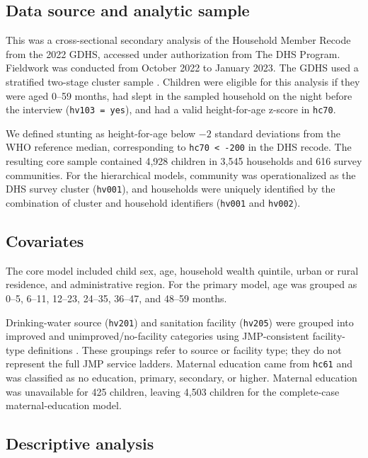 \documentclass[11pt]{article}
\begin{document}
\subsection{Data source and analytic sample}

This was a cross-sectional secondary analysis of the Household Member Recode from the 2022 GDHS, accessed under authorization from The DHS Program. Fieldwork was conducted from October 2022 to January 2023. The GDHS used a stratified two-stage cluster sample \citep{GSSICF2024}. Children were eligible for this analysis if they were aged 0--59 months, had slept in the sampled household on the night before the interview (\texttt{hv103 = yes}), and had a valid height-for-age z-score in \texttt{hc70}.

We defined stunting as height-for-age below $-2$ standard deviations from the WHO reference median, corresponding to \texttt{hc70 < -200} in the DHS recode. The resulting core sample contained 4,928 children in 3,545 households and 616 survey communities. For the hierarchical models, community was operationalized as the DHS survey cluster (\texttt{hv001}), and households were uniquely identified by the combination of cluster and household identifiers (\texttt{hv001} and \texttt{hv002}).

\subsection{Covariates}

The core model included child sex, age, household wealth quintile, urban or rural residence, and administrative region. For the primary model, age was grouped as 0--5, 6--11, 12--23, 24--35, 36--47, and 48--59 months.

Drinking-water source (\texttt{hv201}) and sanitation facility (\texttt{hv205}) were grouped into improved and unimproved/no-facility categories using JMP-consistent facility-type definitions \citep{WHOUNICEFJMP2021}. These groupings refer to source or facility type; they do not represent the full JMP service ladders. Maternal education came from \texttt{hc61} and was classified as no education, primary, secondary, or higher. Maternal education was unavailable for 425 children, leaving 4,503 children for the complete-case maternal-education model.

\subsection{Descriptive analysis}
\end{document}
